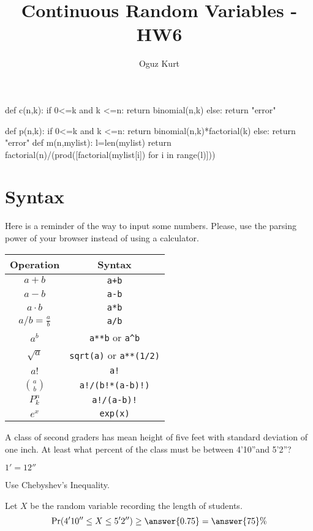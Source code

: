 \documentclass[handout]{ximera}
\title{Continuous Random Variables - HW6}
\author{Oguz Kurt}
\begin{document}
\begin{abstract}
\empty
\end{abstract}
\maketitle
\begin{sagesilent}
def c(n,k):
    if 0<=k and k <=n:
        return binomial(n,k)
    else:
        return "error"

def p(n,k):
    if 0<=k and k <=n:
        return binomial(n,k)*factorial(k)
    else:
        return "error"
def m(n,mylist):
    l=len(mylist)
    return factorial(n)/(prod([factorial(mylist[i]) for i in range(l)]))
\end{sagesilent}



\section*{Syntax}
Here is a reminder of the way to input some numbers. Please, use the parsing power of your browser instead of using a calculator.

\hspace{0.5cm}


\begin{tabular}{c|c}
Operation & Syntax  
\\
\hline
$a+b$ & {\color{red} \verb!a+b!} 
\\
\hline
$a- b$ & {\color{red} \verb!a-b!} 
\\
\hline
$a\cdot b$ & {\color{red} \verb!a*b! } 
\\
\hline
$a/b=\frac{a}{b}$ & {\color{red} \verb!a/b!}
\\
\hline
$a^b$ & {\color{red} \verb|a**b| or \verb|a^b|} 
\\
\hline
$\sqrt{a}$ & {\color{red} \verb|sqrt(a)| or \verb|a**(1/2)|} 
\\
\hline
$a!$ & {\color{red} \verb|a!|} 
\\
\hline
$\binom{a}{b}$ & {\color{red} \verb|a!/(b!*(a-b)!)|}
\\
\hline
$P_k^n$ & {\color{red} \verb|a!/(a-b)!|}
\\
\hline
$e^x$ & {\color{red} \verb|exp(x)|}
\\
\end{tabular}

\hspace{1cm}

\begin{problem}
A class of second graders has mean height of five feet with standard deviation of one inch. At least what percent of the class must be between 4'10''and 5'2''? 
\begin{hint}
\item $1'=12''$
\item Use Chebyshev's Inequality.
\end{hint}
\begin{prompt}%
Let $X$ be the random variable recording the length of students. $$\Pr(4'10''\leq X \leq 5'2'')\geq\answer{0.75}=\answer{75}\%$$
\end{prompt}
\end{problem}
\end{document}
